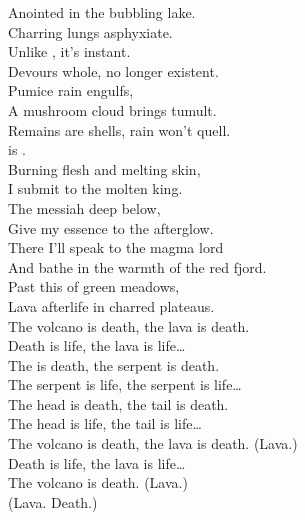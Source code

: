 Anointed in the bubbling lake. \\
Charring lungs asphyxiate. \\
Unlike , it's instant. \\
Devours whole, no longer existent. \\

Pumice rain engulfs, \\
A mushroom cloud brings tumult. \\
Remains are shells, rain won't quell. \\
 is . \\

Burning flesh and melting skin, \\
I submit to the molten king. \\
The messiah deep below, \\
Give my essence to the afterglow. \\

There I'll speak to the magma lord \\
And bathe in the warmth of the red fjord. \\
Past this  of green meadows, \\
Lava afterlife in charred plateaus. \\

The volcano is death, the lava is death. \\
Death is life, the lava is life… \\

The  is death, the serpent is death. \\
The serpent is life, the serpent is life… \\

The head is death, the tail is death. \\
The head is life, the tail is life… \\

The volcano is death, the lava is death. (Lava.) \\
Death is life, the lava is life… \\

The volcano is death. (Lava.) \\
(Lava. Death.) \\




